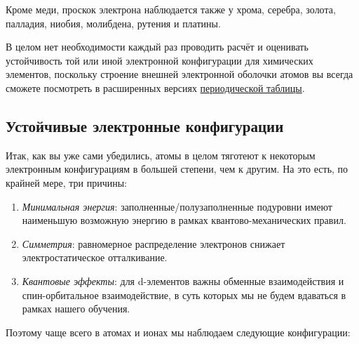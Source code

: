 Кроме меди, проскок электрона наблюдается также у хрома, серебра, золота, палладия, ниобия, молибдена, рутения и платины.

В целом нет необходимости каждый раз проводить расчёт и оценивать устойчивость той или иной электронной конфигурации для химических элементов, поскольку строение внешней электронной оболочки атомов вы всегда сможете посмотреть в расширенных версиях \hyperref[appendix:periodic_table]{периодической таблицы}.

\subsection*{Устойчивые электронные конфигурации}

Итак, как вы уже сами убедились, атомы в целом тяготеют к некоторым электронным конфигурациям в большей степени, чем к другим. На это есть, по крайней мере, три причины:

\begin{enumerate}[label=\arabic*)]
    \item \textit{Минимальная энергия}: заполненные/полузаполненные подуровни имеют наименьшую возможную энергию в рамках квантово\nobreakdash-механических правил.
    \item \textit{Симметрия}: равномерное распределение электронов снижает электростатическое отталкивание.
    \item \textit{Квантовые эффекты}: для d-элементов важны обменные взаимодействия и спин\nobreakdash-орбитальное взаимодействие, в суть которых мы не будем вдаваться в рамках нашего обучения.
\end{enumerate}

Поэтому чаще всего в атомах и ионах мы наблюдаем следующие конфигурации:

